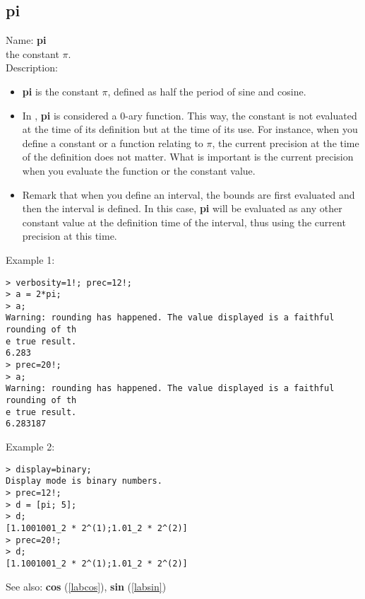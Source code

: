 \subsection{pi}
\label{labpi}
\noindent Name: \textbf{pi}\\
the constant $\pi$.\\
\noindent Description: \begin{itemize}

\item \textbf{pi} is the constant $\pi$, defined as half the period of sine and cosine.

\item In \sollya, \textbf{pi} is considered a 0-ary function. This way, the constant 
   is not evaluated at the time of its definition but at the time of its use. For 
   instance, when you define a constant or a function relating to $\pi$, the current
   precision at the time of the definition does not matter. What is important is 
   the current precision when you evaluate the function or the constant value.

\item Remark that when you define an interval, the bounds are first evaluated and 
   then the interval is defined. In this case, \textbf{pi} will be evaluated as any 
   other constant value at the definition time of the interval, thus using the 
   current precision at this time.
\end{itemize}
\noindent Example 1: 
\begin{center}\begin{minipage}{15cm}\begin{Verbatim}[frame=single]
> verbosity=1!; prec=12!;
> a = 2*pi;
> a;
Warning: rounding has happened. The value displayed is a faithful rounding of th
e true result.
6.283
> prec=20!;
> a;
Warning: rounding has happened. The value displayed is a faithful rounding of th
e true result.
6.283187
\end{Verbatim}
\end{minipage}\end{center}
\noindent Example 2: 
\begin{center}\begin{minipage}{15cm}\begin{Verbatim}[frame=single]
> display=binary;
Display mode is binary numbers.
> prec=12!;
> d = [pi; 5];
> d;
[1.1001001_2 * 2^(1);1.01_2 * 2^(2)]
> prec=20!;
> d;
[1.1001001_2 * 2^(1);1.01_2 * 2^(2)]
\end{Verbatim}
\end{minipage}\end{center}
See also: \textbf{cos} (\ref{labcos}), \textbf{sin} (\ref{labsin})
